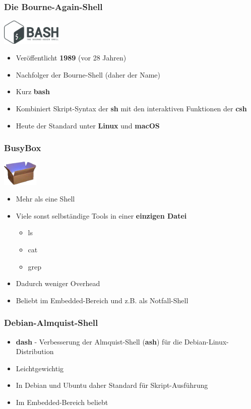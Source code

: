 \begin{frame}
    \frametitle{Die Bourne-Again-Shell}
    \includegraphics[height=1.2cm]{res/bash.png}
    \begin{itemize}
        \item Veröffentlicht \textbf{1989} (vor 28 Jahren)
        \item Nachfolger der Bourne-Shell (daher der Name)
        \item Kurz \textbf{bash}
        \item Kombiniert Skript-Syntax der \textbf{sh} mit den interaktiven Funktionen der \textbf{csh}
        \item Heute der Standard unter \textbf{Linux} und \textbf{macOS}
    \end{itemize}
\end{frame}

\begin{frame}
    \frametitle{BusyBox}
    \includegraphics[height=1.2cm]{res/busybox.png}
    \begin{itemize}
        \item Mehr als eine Shell
        \item Viele sonst selbständige Tools in einer \textbf{einzigen Datei}
        \begin{itemize}
            \item ls
            \item cat
            \item grep
        \end{itemize}
        \item Dadurch weniger Overhead
        \item Beliebt im Embedded-Bereich und z.B. als Notfall-Shell
    \end{itemize}
\end{frame}

\begin{frame}
    \frametitle{Debian-Almquist-Shell}
    \begin{itemize}
        \item \textbf{dash} - Verbesserung der Almquist-Shell (\textbf{ash}) für die Debian-Linux-Distribution
        \item Leichtgewichtig
        \item In Debian und Ubuntu daher Standard für Skript-Ausführung
        \item Im Embedded-Bereich beliebt
    \end{itemize}
\end{frame}

